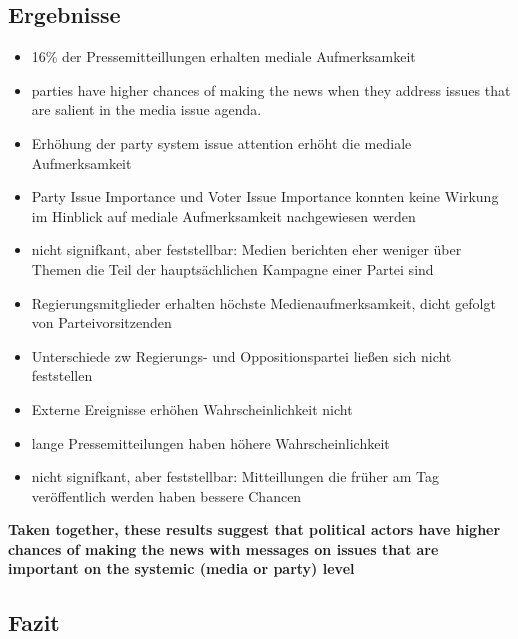 \documentclass[11pt]{article}
\begin{document}
\subsection{Ergebnisse}
\label{sec:org7dfc114}
\begin{itemize}
\item 16\% der Pressemitteillungen erhalten mediale Aufmerksamkeit
\item parties have higher chances of making the news when they address issues that are salient in the media issue agenda.
\item Erhöhung der party system issue attention erhöht die mediale Aufmerksamkeit
\item Party Issue Importance und Voter Issue Importance konnten keine Wirkung im Hinblick auf mediale Aufmerksamkeit nachgewiesen werden
\item nicht signifkant, aber feststellbar: Medien berichten eher weniger über Themen die Teil der hauptsächlichen Kampagne einer Partei sind
\item Regierungsmitglieder erhalten höchste Medienaufmerksamkeit, dicht gefolgt von Parteivorsitzenden
\item Unterschiede zw Regierungs- und Oppositionspartei ließen sich nicht feststellen
\item Externe Ereignisse erhöhen Wahrscheinlichkeit nicht
\item lange Pressemitteilungen haben höhere Wahrscheinlichkeit
\item nicht signifkant, aber feststellbar: Mitteillungen die früher am Tag veröffentlich werden haben bessere Chancen
\end{itemize}

\textbf{Taken together, these results suggest that political actors have higher chances of making the news with messages on issues that are important on the systemic (media or party) level}

\subsection{Fazit}
\label{sec:orgcdb2fcc}
\end{document}

